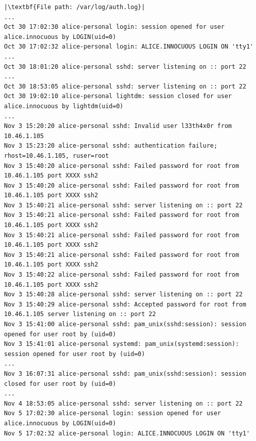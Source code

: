 \documentclass[addpoints]{exam}
\begin{document}
\begin{questions}
\begin{lstlisting}
|\textbf{File path: /var/log/auth.log}|
...
Oct 30 17:02:30 alice-personal login: session opened for user alice.innocuous by LOGIN(uid=0)
Oct 30 17:02:32 alice-personal login: ALICE.INNOCUOUS LOGIN ON 'tty1'
...
Oct 30 18:01:20 alice-personal sshd: server listening on :: port 22
...
Oct 30 18:53:05 alice-personal sshd: server listening on :: port 22
Oct 30 19:02:10 alice-personal lightdm: session closed for user alice.innocuous by lightdm(uid=0)
...
Nov 3 15:20:20 alice-personal sshd: Invalid user l33th4x0r from 10.46.1.105
Nov 3 15:23:20 alice-personal sshd: authentication failure; rhost=10.46.1.105, ruser=root
Nov 3 15:40:20 alice-personal sshd: Failed password for root from 10.46.1.105 port XXXX ssh2
Nov 3 15:40:20 alice-personal sshd: Failed password for root from 10.46.1.105 port XXXX ssh2
Nov 3 15:40:21 alice-personal sshd: server listening on :: port 22
Nov 3 15:40:21 alice-personal sshd: Failed password for root from 10.46.1.105 port XXXX ssh2
Nov 3 15:40:21 alice-personal sshd: Failed password for root from 10.46.1.105 port XXXX ssh2
Nov 3 15:40:21 alice-personal sshd: Failed password for root from 10.46.1.105 port XXXX ssh2
Nov 3 15:40:22 alice-personal sshd: Failed password for root from 10.46.1.105 port XXXX ssh2
Nov 3 15:40:28 alice-personal sshd: server listening on :: port 22
Nov 3 15:40:29 alice-personal sshd: Accepted password for root from 10.46.1.105 server listening on :: port 22
Nov 3 15:41:00 alice-personal sshd: pam_unix(sshd:session): session opened for user root by (uid=0)
Nov 3 15:41:01 alice-personal systemd: pam_unix(systemd:session): session opened for user root by (uid=0)
...
Nov 3 16:07:31 alice-personal sshd: pam_unix(sshd:session): session closed for user root by (uid=0)
...
Nov 4 18:53:05 alice-personal sshd: server listening on :: port 22
Nov 5 17:02:30 alice-personal login: session opened for user alice.innocuous by LOGIN(uid=0)
Nov 5 17:02:32 alice-personal login: ALICE.INNOCUOUS LOGIN ON 'tty1'

\end{lstlisting}

\pagebreak

\begin{lstlisting}


\end{lstlisting}
\end{questions}
\end{document}
